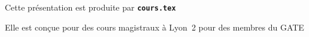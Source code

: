 
  \item Cette présentation est produite par \texttt{\textbf{cours.tex}}
  \item Elle est conçue pour des cours magistraux à Lyon~2 pour des membres du GATE
